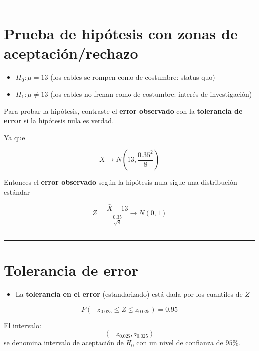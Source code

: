 \documentclass[
]{book}
\providecommand{\tightlist}{%
  \setlength{\itemsep}{0pt}\setlength{\parskip}{0pt}}
\begin{document}
\begin{center}\rule{0.5\linewidth}{0.5pt}\end{center}

\hypertarget{prueba-de-hipuxf3tesis-con-zonas-de-aceptaciuxf3nrechazo}{%
\section{Prueba de hipótesis con zonas de aceptación/rechazo}\label{prueba-de-hipuxf3tesis-con-zonas-de-aceptaciuxf3nrechazo}}

\begin{itemize}
\tightlist
\item
  \(H_0:\mu = 13\) (los cables se rompen como de costumbre: status quo)
\item
  \(H_1:\mu \neq 13\) (los cables no frenan como de costumbre: interés de investigación)
\end{itemize}

Para probar la hipótesis, contraste el \textbf{error observado} con la \textbf{tolerancia de error} si la hipótesis nula es verdad.

Ya que

\[\bar{X} \rightarrow N(13, \frac{0.35^2}{8})\]

Entonces el \textbf{error observado} según la hipótesis nula sigue una distribución estándar

\[Z=\frac{\bar{X}-13}{\frac{0.35}{\sqrt{8}}} \rightarrow N(0,1)\]

\begin{center}\rule{0.5\linewidth}{0.5pt}\end{center}

\begin{center}\rule{0.5\linewidth}{0.5pt}\end{center}

\hypertarget{tolerancia-de-error}{%
\section{Tolerancia de error}\label{tolerancia-de-error}}

\begin{itemize}
\tightlist
\item
  La \textbf{tolerancia en el error} (estandarizado) está dada por los cuantiles de \(Z\)
\end{itemize}

\[P(-z_{0.025} \leq Z \leq z_{0.025})=0.95\]

El intervalo: \[(-z_{0.025}, z_{0.025})\] se denomina intervalo de aceptación de \(H_0\) con un nivel de confianza de \(95\%\).
\end{document}
